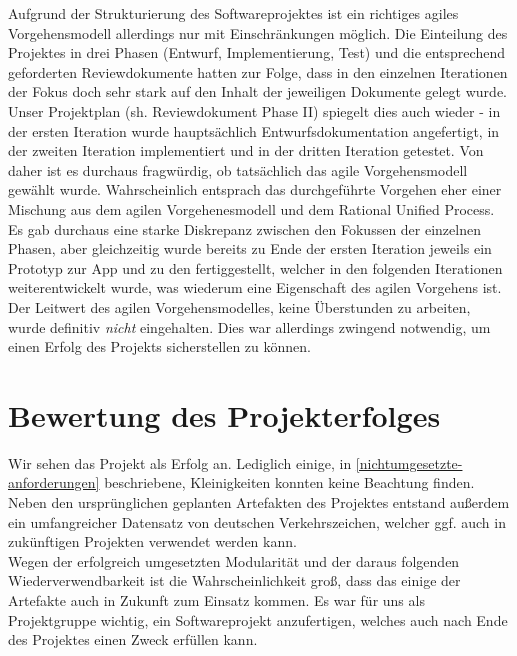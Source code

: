 \documentclass[12pt,a4paper,ngerman,enabledeprecatedfontcommands]{scrreprt}
\begin{document}
Aufgrund der Strukturierung des Softwareprojektes ist ein \glqq{}richtiges\grqq{} agiles Vorgehensmodell allerdings nur mit Einschränkungen möglich. Die Einteilung des Projektes in drei Phasen (Entwurf, Implementierung, Test) und die entsprechend geforderten Reviewdokumente hatten zur Folge, dass in den einzelnen Iterationen der Fokus doch sehr stark auf den Inhalt der jeweiligen Dokumente gelegt wurde. Unser Projektplan (sh. Reviewdokument Phase II) spiegelt dies auch wieder - in der ersten Iteration wurde hauptsächlich Entwurfsdokumentation angefertigt, in der zweiten Iteration implementiert und in der dritten Iteration getestet. Von daher ist es durchaus fragwürdig, ob tatsächlich das agile Vorgehensmodell gewählt wurde. Wahrscheinlich entsprach das durchgeführte Vorgehen eher einer Mischung aus dem agilen Vorgehenesmodell und dem Rational Unified Process. Es gab durchaus eine starke Diskrepanz zwischen den Fokussen der einzelnen Phasen, aber gleichzeitig wurde bereits zu Ende der ersten Iteration jeweils ein Prototyp zur \gls{App} und zu den  fertiggestellt, welcher in den folgenden Iterationen weiterentwickelt wurde, was wiederum eine Eigenschaft des agilen Vorgehens ist.\\
Der Leitwert des agilen Vorgehensmodelles, keine Überstunden zu arbeiten, wurde definitiv \emph{nicht} eingehalten. Dies war allerdings zwingend notwendig, um einen Erfolg des Projekts sicherstellen zu können.\\

\chapter{Bewertung des Projekterfolges}%

Wir sehen das Projekt als Erfolg an. Lediglich einige, in \cref{nichtumgesetzte-anforderungen} beschriebene, Kleinigkeiten konnten keine Beachtung finden. Neben den ursprünglichen geplanten Artefakten des Projektes entstand außerdem ein umfangreicher Datensatz von deutschen Verkehrszeichen, welcher ggf. auch in zukünftigen Projekten verwendet werden kann.\\
Wegen der erfolgreich umgesetzten Modularität und der daraus folgenden Wiederverwendbarkeit ist die Wahrscheinlichkeit groß, dass das einige der Artefakte auch in Zukunft zum Einsatz kommen. Es war für uns als Projektgruppe wichtig, ein Softwareprojekt anzufertigen, welches auch nach Ende des Projektes einen Zweck erfüllen kann.\\
\end{document}
